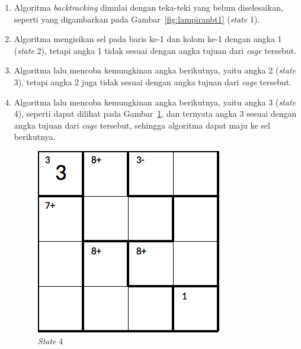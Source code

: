\begin{enumerate}
\item Algoritma \textit{backtracking} dimulai dengan teka-teki yang belum diselesaikan, seperti yang digambarkan pada Gambar~\ref{fig:lampiranbt1} (\textit{state} 1).
\item Algoritma mengisikan sel pada baris ke-1 dan kolom ke-1 dengan angka 1 (\textit{state} 2), tetapi angka 1 tidak sesuai dengan angka tujuan dari \textit{cage} tersebut.
\item Algoritma lalu mencoba kemungkinan angka berikutnya, yaitu angka 2 (\textit{state} 3), tetapi angka 2 juga tidak sesuai dengan angka tujuan dari \textit{cage} tersebut.
\item Algoritma lalu mencoba kemungkinan angka berikutnya, yaitu angka 3 (\textit{state} 4), seperti dapat dilihat pada Gambar~\ref{fig:lampiranbt2}, dan ternyata angka 3 sesuai dengan angka tujuan dari \textit{cage} tersebut, sehingga algoritma dapat maju ke sel berikutnya.

\begin{figure}
\centering
\captionsetup{justification=centering}
\includegraphics[scale=0.333]{Gambar/backtracking/State4}
\caption[\textit{State} 4]{\textit{State} 4}
\label{fig:lampiranbt2}
\end{figure}


\end{enumerate}
